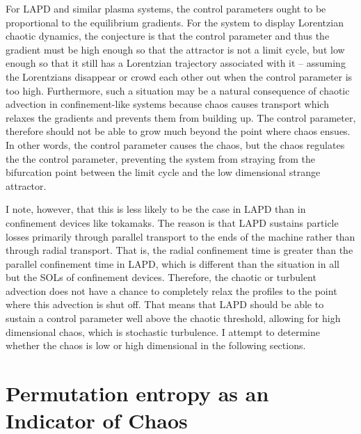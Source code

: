 For LAPD and similar plasma systems, the control parameters ought to be proportional to the equilibrium gradients. 
For the system to display Lorentzian chaotic dynamics, the conjecture is that the control parameter and thus the gradient must be high enough so that the attractor is not
a limit cycle, but low enough so that it still has a Lorentzian trajectory associated with it -- assuming the Lorentzians disappear or crowd each other out when the control parameter is too high.
Furthermore, such a situation may be a natural consequence of chaotic advection in confinement-like systems because chaos causes
transport which relaxes the gradients and prevents them from building up. The control parameter, therefore should not be able to grow much beyond the point where chaos ensues. 
In other words, the control parameter
causes the chaos, but the chaos regulates the the control parameter, preventing the system from straying from the bifurcation point between the limit cycle and the low dimensional strange attractor.

I note, however, that this is less likely to be the case in LAPD than in confinement devices like tokamaks. The reason is that LAPD sustains particle losses primarily through parallel transport
to the ends of the machine rather than through radial transport. That is, the radial confinement time is greater than the parallel confinement time in LAPD, which is different than the situation
in all but the SOLs of confinement devices. Therefore, the chaotic or turbulent advection does not have a chance to completely relax the profiles to the point where this advection is shut off.
That means that LAPD should be able to sustain a control parameter well above the chaotic threshold, allowing for high dimensional chaos, which is stochastic turbulence. I attempt to determine whether
the chaos is low or high dimensional in the following sections.


\section{Permutation entropy as an Indicator of Chaos}
\label{s_ent_comp}

